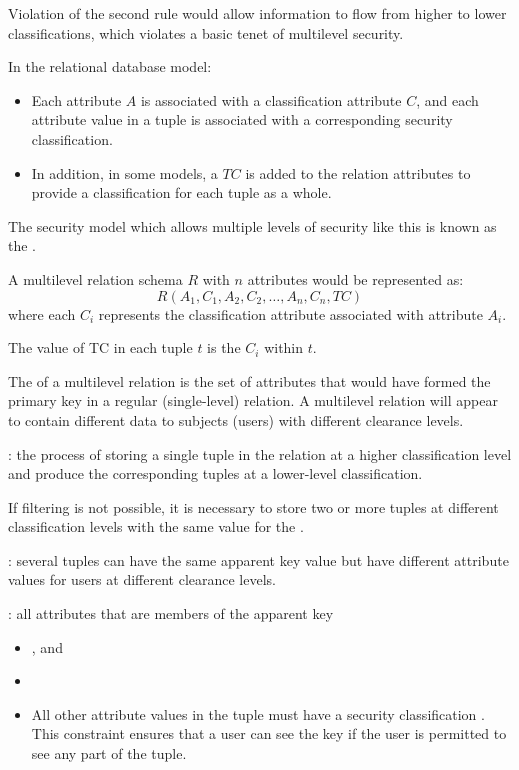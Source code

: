   \par Violation of the second rule would allow information to flow from higher to lower classifications, which violates a basic tenet of multilevel security.

  \par In the relational database model:
  \begin{itemize}
    \item Each attribute $A$ is associated with a classification attribute $C$, and each attribute value in a tuple is associated with a corresponding security classification.
    \item In addition, in some models, a  $TC$ is added to the relation attributes to provide a classification for each tuple as a whole.
  \end{itemize}
  \par The security model which allows multiple levels of security like this is known as the .
  \par A multilevel relation schema $R$ with $n$ attributes would be represented as:
    \[
      R(A_1, C_1 ,A_2, C_2, \ldots, A_n, C_n , TC)
    \]
  where each $C_i$ represents the classification attribute associated with attribute $A_i$.
  \par The value of TC in each tuple $t$ is the  $C_i$ within $t$.
  \par The  of a multilevel relation is the set of attributes that would have
formed the primary key in a regular (single-level) relation. A multilevel relation will
appear to contain different data to subjects (users) with different clearance levels.
  \par {}: the process of storing a single tuple in the relation at a higher classification level and produce the corresponding tuples at a lower-level classification.
  \par If filtering is not possible, it is necessary to store two or more tuples at different classification levels with the same value for the .
  \par {}: several tuples can have the same apparent key value but have different attribute values for users at different clearance levels.
  \par {}: all attributes that are members of the apparent key
  \begin{itemize}
    \item {}, and
    \item {}
    \item All other attribute values in the tuple must have a security classification . This constraint ensures that a user can see the key if the user is permitted to see any part of the tuple. 
  \end{itemize}
